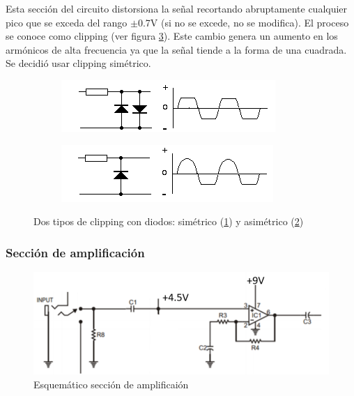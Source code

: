 \documentclass[../../main.tex]{subfiles}
\begin{document}
Esta secci\'on del circuito distorsiona la se\~nal recortando abruptamente cualquier pico que se exceda del rango $\pm$0.7V (si no se excede, no se modifica). El proceso se conoce como clipping (ver figura \ref{fig:ej5_diode_clipping}). Este cambio genera un aumento en los arm\'onicos de alta frecuencia ya que la se\~nal tiende a la forma de una cuadrada. Se decidi\'o usar clipping sim\'etrico.

\begin{figure}		%
	\centering
	\begin{subfigure}[b]{0.45\textwidth}
		\centering
		\includegraphics[scale=.8]{imagenes/diode_clipping_symmetrical.png}
		\caption{}
		\label{fig:ej5_diode_clipping_sym}
	\end{subfigure}
	\begin{subfigure}[b]{0.45\textwidth}
		\centering
		\includegraphics[scale=.8]{imagenes/diode_clipping_asymmetrical.png}
		\caption{ }
		\label{fig:ej5_diode_clipping_asym}
	\end{subfigure}
	\caption{Dos tipos de clipping con diodos: sim\'etrico (\ref{fig:ej5_diode_clipping_sym}) y asim\'etrico (\ref{fig:ej5_diode_clipping_asym})}
	\label{fig:ej5_diode_clipping}
\end{figure}

\subsubsection{Secci\'on de amplificaci\'on}

\begin{figure}[H]	%
	\centering
	\includegraphics[scale=1]{imagenes/esquematico_amplificacion.png}
	\caption{Esquem\'atico secci\'on de amplificai\'on}
	\label{fig:ej5_esquematico_amplificacion}
\end{figure}
\end{document}

